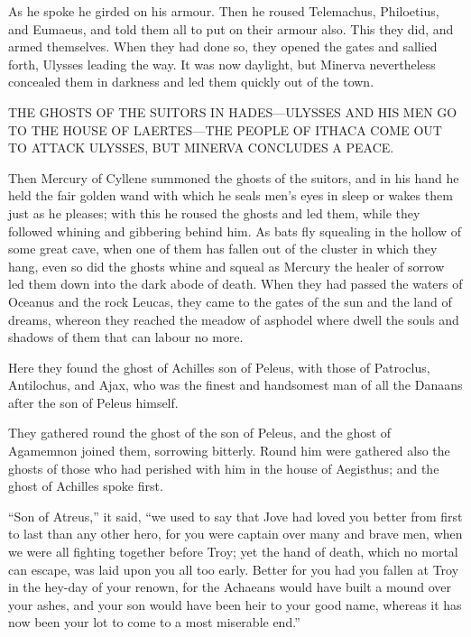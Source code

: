 As he spoke he girded on his armour. Then he roused Telemachus, Philoetius, and
Eumaeus, and told them all to put on their armour also. This they did, and
armed themselves. When they had done so, they opened the gates and sallied
forth, Ulysses leading the way. It was now daylight, but Minerva nevertheless
concealed them in darkness and led them quickly out of the town.


THE GHOSTS OF THE SUITORS IN HADES—ULYSSES AND HIS MEN GO TO THE HOUSE OF
LAERTES—THE PEOPLE OF ITHACA COME OUT TO ATTACK ULYSSES, BUT MINERVA CONCLUDES
A PEACE.

Then Mercury of Cyllene summoned the ghosts of the suitors, and in his hand he
held the fair golden wand with which he seals men’s eyes in sleep or wakes them
just as he pleases; with this he roused the ghosts and led them, while they
followed whining and gibbering behind him. As bats fly squealing in the hollow
of some great cave, when one of them has fallen out of the cluster in which
they hang, even so did the ghosts whine and squeal as Mercury the healer of
sorrow led them down into the dark abode of death. When they had passed the
waters of Oceanus and the rock Leucas, they came to the gates of the sun and
the land of dreams, whereon they reached the meadow of asphodel where dwell the
souls and shadows of them that can labour no more.

Here they found the ghost of Achilles son of Peleus, with those of Patroclus,
Antilochus, and Ajax, who was the finest and handsomest man of all the Danaans
after the son of Peleus himself.

They gathered round the ghost of the son of Peleus, and the ghost of Agamemnon
joined them, sorrowing bitterly. Round him were gathered also the ghosts of
those who had perished with him in the house of Aegisthus; and the ghost of
Achilles spoke first.

“Son of Atreus,” it said, “we used to say that Jove had loved you better from
first to last than any other hero, for you were captain over many and brave
men, when we were all fighting together before Troy; yet the hand of death,
which no mortal can escape, was laid upon you all too early. Better for you had
you fallen at Troy in the hey-day of your renown, for the Achaeans would have
built a mound over your ashes, and your son would have been heir to your good
name, whereas it has now been your lot to come to a most miserable end.”

